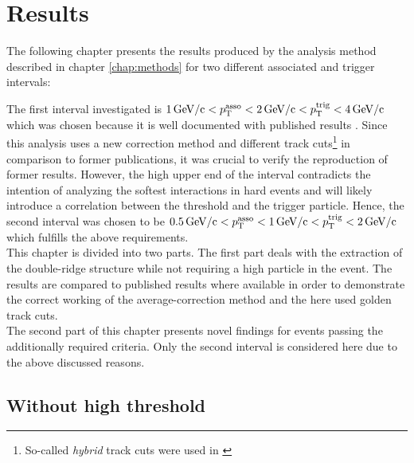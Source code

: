 \chapter{Results}
\label{chap:results}
The following chapter presents the results produced by the analysis method described in chapter \ref{chap:methods} for two different associated and trigger \pt intervals:

The first interval investigated is $\SI{1}{GeV/c} < p_{\text{T}}^{\text{asso}} < \SI{2}{GeV/c} < p_{\text{T}}^{\text{trig}} < \SI{4}{GeV/c}$ which was chosen because it is well documented with published results \cite{Abelev2012}. Since this analysis uses a new correction method and different track cuts\footnote{So-called \emph{hybrid} track cuts were used in \cite{Abelev2012}} in comparison to former publications, it was crucial to verify the reproduction of former results. However, the high upper end of the \pttrig interval contradicts the intention of analyzing the softest interactions in hard events and will likely introduce a correlation between the threshold and the trigger particle. Hence, the second interval was chosen to be $\SI{0.5}{GeV/c} < p_{\text{T}}^{\text{asso}} < \SI{1}{GeV/c} < p_{\text{T}}^{\text{trig}} < \SI{2}{GeV/c}$ which fulfills the above requirements.\\

This chapter is divided into two parts. The first part deals with the extraction of the double-ridge structure while not requiring a high \pt particle in the event. The results are compared to published results where available in order to demonstrate the correct working of the average-correction method and the here used golden track cuts.\\

The second part of this chapter presents novel findings for events passing the additionally required \ptthresh criteria. Only the second interval is considered here due to the above discussed reasons.

\section[Without high \pt threshold]{Without high \ptbold  threshold}
\label{sec:no-thresh}

